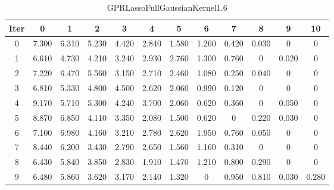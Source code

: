 \begin{table}
	\begin{center}
		\begin{tabular}{|c|c|c|c|c|c|c|c|c|c|c|c|}
			\hline
			Iter & 0 & 1 & 2 & 3 & 4 & 5 & 6 & 7 & 8 & 9 & 10 \\
			\hline
			0 & 7.300 & 6.310 & 5.230 & 4.420 & 2.840 & 1.580 & 1.260 & 0.420 & 0.030 & 0 & 0 \\
			\hline
			1 & 6.610 & 4.730 & 4.210 & 3.240 & 2.930 & 2.760 & 1.300 & 0.760 & 0 & 0.020 & 0 \\
			\hline
			2 & 7.220 & 6.470 & 5.560 & 3.150 & 2.710 & 2.460 & 1.080 & 0.250 & 0.040 & 0 & 0 \\
			\hline
			3 & 6.810 & 5.330 & 4.800 & 4.500 & 2.620 & 2.060 & 0.990 & 0.120 & 0 & 0 & 0 \\
			\hline
			4 & 9.170 & 5.710 & 5.300 & 4.240 & 3.700 & 2.060 & 0.620 & 0.360 & 0 & 0.050 & 0 \\
			\hline
			5 & 8.870 & 6.850 & 4.110 & 3.350 & 2.080 & 1.500 & 0.620 & 0 & 0.220 & 0.030 & 0 \\
			\hline
			6 & 7.100 & 6.980 & 4.160 & 3.210 & 2.780 & 2.620 & 1.950 & 0.760 & 0.050 & 0 & 0 \\
			\hline
			7 & 8.440 & 6.200 & 3.430 & 2.790 & 2.650 & 1.560 & 1.160 & 0.310 & 0 & 0 & 0 \\
			\hline
			8 & 6.430 & 5.840 & 3.850 & 2.830 & 1.910 & 1.470 & 1.210 & 0.800 & 0.290 & 0 & 0 \\
			\hline
			9 & 6.480 & 5.860 & 3.620 & 3.170 & 2.140 & 1.320 & 0 & 0.950 & 0.810 & 0.030 & 0.280 \\
			\hline
		\end{tabular}
	\end{center}
	\caption{GPRLassoFullGaussianKernel1.6}
\end{table}